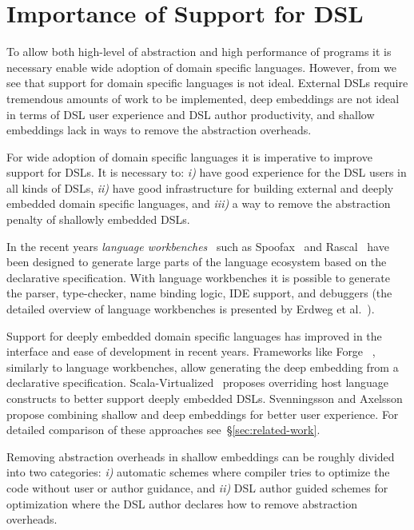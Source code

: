 \section{Importance of Support for DSL}
\label{sec:importance-of-language-support}

To allow both high-level of abstraction and high performance of programs it is necessary
 enable wide adoption of domain specific languages. However, from  we
 see that support for domain specific languages is not ideal. External DSLs require
 tremendous amounts of work to be implemented, deep embeddings are not ideal in terms
 of DSL user experience and DSL author productivity, and shallow embeddings lack in
 ways to remove the abstraction overheads.

 For wide adoption of domain specific languages it is imperative to improve support
 for DSLs. It is necessary to: \emph{i)} have good experience for the DSL users in all kinds of DSLs,
  \emph{ii)} have good infrastructure for building external and deeply embedded domain specific languages, and \emph{iii)} a
 way to remove the abstraction penalty of shallowly embedded DSLs.

In the recent years \emph{language workbenches}~\cite{fowler2005language} such as
 Spoofax~\cite{kats2010spoofax} and Rascal~\cite{klint2009rascal,van2011rascal} have been designed
  to generate large parts of the language ecosystem based on the declarative specification.
  With language workbenches it is possible to generate the parser, type-checker, name binding logic,
  IDE support, and debuggers (the detailed overview of language workbenches is presented
  by Erdweg et al.~\cite{erdweg2013state}).

Support for deeply embedded domain specific languages has improved in the interface and
ease of development in recent years. Frameworks like Forge~\cite{forge}
, similarly to language workbenches, allow generating the deep embedding from a declarative
specification. Scala-Virtualized~\cite{rompf_scala-virtualized:_2009} proposes overriding
 host language constructs to better support deeply embedded DSLs. Svenningsson and Axelsson~\cite{svenningsson_combining_2012}
 propose combining shallow and deep embeddings for better user experience. For detailed
 comparison of these approaches see~\S \ref{sec:related-work}.

Removing abstraction overheads in shallow embeddings can be roughly
 divided into two categories: \emph{i)} automatic schemes where compiler tries
 to optimize the code without user or author guidance, and \emph{ii)} DSL author
 guided schemes for optimization where the DSL author declares how to remove
 abstraction overheads.

